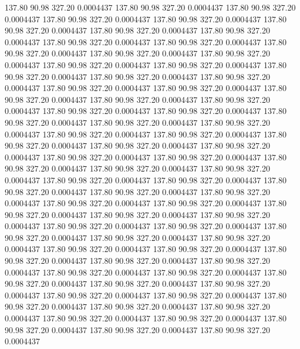  137.80   90.98  327.20   0.0004437
 137.80   90.98  327.20   0.0004437
 137.80   90.98  327.20   0.0004437
 137.80   90.98  327.20   0.0004437
 137.80   90.98  327.20   0.0004437
 137.80   90.98  327.20   0.0004437
 137.80   90.98  327.20   0.0004437
 137.80   90.98  327.20   0.0004437
 137.80   90.98  327.20   0.0004437
 137.80   90.98  327.20   0.0004437
 137.80   90.98  327.20   0.0004437
 137.80   90.98  327.20   0.0004437
 137.80   90.98  327.20   0.0004437
 137.80   90.98  327.20   0.0004437
 137.80   90.98  327.20   0.0004437
 137.80   90.98  327.20   0.0004437
 137.80   90.98  327.20   0.0004437
 137.80   90.98  327.20   0.0004437
 137.80   90.98  327.20   0.0004437
 137.80   90.98  327.20   0.0004437
 137.80   90.98  327.20   0.0004437
 137.80   90.98  327.20   0.0004437
 137.80   90.98  327.20   0.0004437
 137.80   90.98  327.20   0.0004437
 137.80   90.98  327.20   0.0004437
 137.80   90.98  327.20   0.0004437
 137.80   90.98  327.20   0.0004437
 137.80   90.98  327.20   0.0004437
 137.80   90.98  327.20   0.0004437
 137.80   90.98  327.20   0.0004437
 137.80   90.98  327.20   0.0004437
 137.80   90.98  327.20   0.0004437
 137.80   90.98  327.20   0.0004437
 137.80   90.98  327.20   0.0004437
 137.80   90.98  327.20   0.0004437
 137.80   90.98  327.20   0.0004437
 137.80   90.98  327.20   0.0004437
 137.80   90.98  327.20   0.0004437
 137.80   90.98  327.20   0.0004437
 137.80   90.98  327.20   0.0004437
 137.80   90.98  327.20   0.0004437
 137.80   90.98  327.20   0.0004437
 137.80   90.98  327.20   0.0004437
 137.80   90.98  327.20   0.0004437
 137.80   90.98  327.20   0.0004437
 137.80   90.98  327.20   0.0004437
 137.80   90.98  327.20   0.0004437
 137.80   90.98  327.20   0.0004437
 137.80   90.98  327.20   0.0004437
 137.80   90.98  327.20   0.0004437
 137.80   90.98  327.20   0.0004437
 137.80   90.98  327.20   0.0004437
 137.80   90.98  327.20   0.0004437
 137.80   90.98  327.20   0.0004437
 137.80   90.98  327.20   0.0004437
 137.80   90.98  327.20   0.0004437
 137.80   90.98  327.20   0.0004437
 137.80   90.98  327.20   0.0004437
 137.80   90.98  327.20   0.0004437
 137.80   90.98  327.20   0.0004437
 137.80   90.98  327.20   0.0004437
 137.80   90.98  327.20   0.0004437
 137.80   90.98  327.20   0.0004437
 137.80   90.98  327.20   0.0004437
 137.80   90.98  327.20   0.0004437
 137.80   90.98  327.20   0.0004437
 137.80   90.98  327.20   0.0004437
 137.80   90.98  327.20   0.0004437
 137.80   90.98  327.20   0.0004437
 137.80   90.98  327.20   0.0004437
 137.80   90.98  327.20   0.0004437
 137.80   90.98  327.20   0.0004437
 137.80   90.98  327.20   0.0004437
